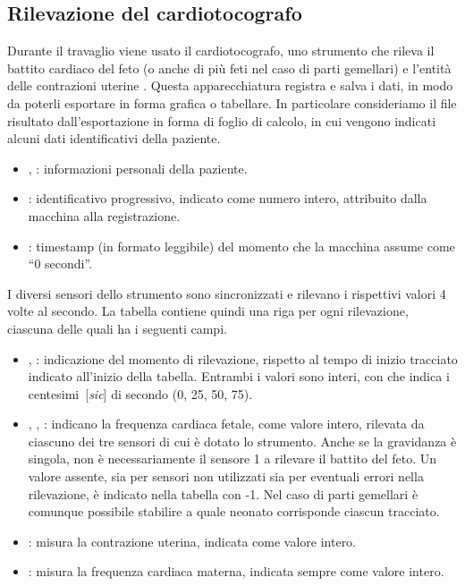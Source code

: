 \subsection{Rilevazione del cardiotocografo}
\label{cardiotocograph}

Durante il travaglio viene usato il cardiotocografo, uno strumento che rileva il battito cardiaco del feto (o anche di più feti nel caso di parti gemellari) e l'entità delle contrazioni uterine \cite{Ayr18}.
Questa apparecchiatura registra e salva i dati, in modo da poterli esportare in forma grafica o tabellare.
In particolare consideriamo il file risultato dall'esportazione in forma di foglio di calcolo, in cui vengono indicati alcuni dati identificativi della paziente.

\begin{itemize}
\item {}, : informazioni personali della paziente.
\item {}: identificativo progressivo, indicato come numero intero, attribuito dalla macchina alla registrazione.
\item {}: timestamp (in formato leggibile) del momento che la macchina assume come \enquote{0 secondi}.
\end{itemize}

I diversi sensori dello strumento sono sincronizzati e rilevano i rispettivi valori 4 volte al secondo.
La tabella contiene quindi una riga per ogni rilevazione, ciascuna delle quali ha i seguenti campi.

\begin{itemize}
\item {}, : indicazione del momento di rilevazione, rispetto al tempo di inizio tracciato indicato all'inizio della tabella. Entrambi i valori sono interi, con  che indica i centesimi~[\textit{sic}] di secondo (0, 25, 50, 75).
\item {}, , : indicano la frequenza cardiaca fetale, come valore intero, rilevata da ciascuno dei tre sensori di cui è dotato lo strumento. Anche se la gravidanza è singola, non è necessariamente il sensore 1 a rilevare il battito del feto. Un valore assente, sia per sensori non utilizzati sia per eventuali errori nella rilevazione, è indicato nella tabella con -1.
Nel caso di parti gemellari è comunque possibile stabilire a quale neonato corrisponde ciascun tracciato.
\item {}: misura la contrazione uterina, indicata come valore intero.
\item {}: misura la frequenza cardiaca materna, indicata sempre come valore intero.
\end{itemize}


